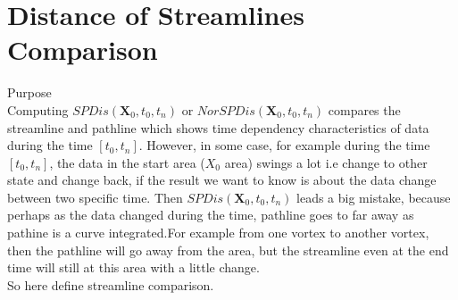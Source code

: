 \documentclass[
     11pt,         %
     a4paper,      %
     oneside,
     ]{article}
\newcommand{\vect}[1]{\boldsymbol{#1}}
\begin{document}
\section{Distance of Streamlines Comparison}

 Purpose\\
	Computing $SPDis(\vect{X}_{0},t_{0},t_{n})$ or $NorSPDis(\vect{X}_{0},t_{0},t_{n})$ compares the streamline and pathline which shows time dependency characteristics of data during the time $[t_{0},t_{n}]$. However, in some case, for example during the time $[t_{0},t_{n}]$, the data in the start area ($X_{0}$ area) swings a lot i.e change to other state and change back, if the result we want to know is about the data change between two specific time. Then $SPDis(\vect{X}_{0},t_{0},t_{n})$ leads a big mistake, because perhaps as the data changed during the time, pathline goes to far away as pathine is a curve integrated.For example from one vortex to another vortex, then the pathline will go away from the area, but the streamline even at the end time will still at this area with a little change.\\ So here define streamline comparison.
	
\end{document}
